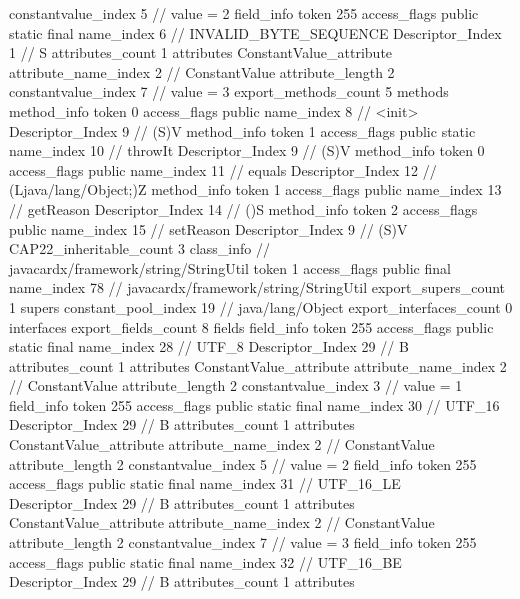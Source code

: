 {{{{{{{					constantvalue_index	5		// value = 2
				}
				}
			}
			field_info {
				token	255
				access_flags	public static final
				name_index	6		// INVALID_BYTE_SEQUENCE
				Descriptor_Index	1		// S
				attributes_count	1
				attributes {
				ConstantValue_attribute {
					attribute_name_index	2		// ConstantValue
					attribute_length	2
					constantvalue_index	7		// value = 3
				}
				}
			}
			}
			export_methods_count	5
			methods {
				method_info {
					token	0
					access_flags	public
					name_index	8		// <init>
					Descriptor_Index	9		// (S)V
				}
				method_info {
					token	1
					access_flags	public static
					name_index	10		// throwIt
					Descriptor_Index	9		// (S)V
				}
				method_info {
					token	0
					access_flags	public
					name_index	11		// equals
					Descriptor_Index	12		// (Ljava/lang/Object;)Z
				}
				method_info {
					token	1
					access_flags	public
					name_index	13		// getReason
					Descriptor_Index	14		// ()S
				}
				method_info {
					token	2
					access_flags	public
					name_index	15		// setReason
					Descriptor_Index	9		// (S)V
				}
			}
			CAP22_inheritable_count	3
		}
		class_info {		// javacardx/framework/string/StringUtil
			token	1
			access_flags	public final
			name_index	78		// javacardx/framework/string/StringUtil
			export_supers_count	1
			supers {
				constant_pool_index	19		// java/lang/Object
			}
			export_interfaces_count	0
			interfaces {
			}
			export_fields_count	8
			fields {
			field_info {
				token	255
				access_flags	public static final
				name_index	28		// UTF_8
				Descriptor_Index	29		// B
				attributes_count	1
				attributes {
				ConstantValue_attribute {
					attribute_name_index	2		// ConstantValue
					attribute_length	2
					constantvalue_index	3		// value = 1
				}
				}
			}
			field_info {
				token	255
				access_flags	public static final
				name_index	30		// UTF_16
				Descriptor_Index	29		// B
				attributes_count	1
				attributes {
				ConstantValue_attribute {
					attribute_name_index	2		// ConstantValue
					attribute_length	2
					constantvalue_index	5		// value = 2
				}
				}
			}
			field_info {
				token	255
				access_flags	public static final
				name_index	31		// UTF_16_LE
				Descriptor_Index	29		// B
				attributes_count	1
				attributes {
				ConstantValue_attribute {
					attribute_name_index	2		// ConstantValue
					attribute_length	2
					constantvalue_index	7		// value = 3
				}
				}
			}
			field_info {
				token	255
				access_flags	public static final
				name_index	32		// UTF_16_BE
				Descriptor_Index	29		// B
				attributes_count	1
				attributes {
}}}}}}
